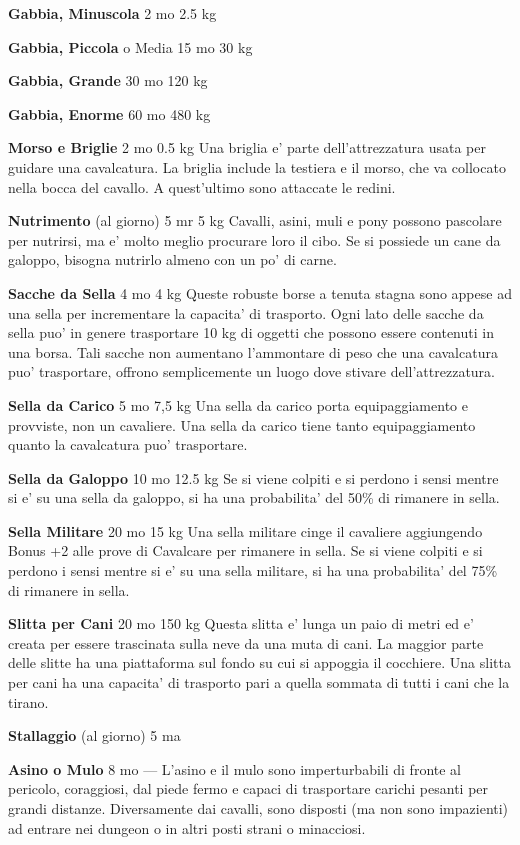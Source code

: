 \documentclass[a4paper,11pt,twoside,openany]{dndbook}
\begin{document}
{\textbf{Gabbia, Minuscola} 2 mo 2.5 kg

\textbf{Gabbia, Piccola} o Media 15 mo 30 kg

\textbf{Gabbia, Grande} 30 mo 120 kg

\textbf{Gabbia, Enorme} 60 mo 480 kg

\textbf{Morso e Briglie} 2 mo 0.5 kg Una briglia e' parte dell'attrezzatura usata per guidare una cavalcatura. La briglia include la testiera e il morso, che va collocato nella bocca del cavallo. A quest'ultimo sono attaccate le redini.

\textbf{Nutrimento} (al giorno) 5 mr 5 kg Cavalli, asini, muli e pony possono pascolare per nutrirsi, ma e' molto meglio procurare loro il cibo. Se si possiede un cane da galoppo, bisogna nutrirlo almeno con un po' di carne.

\textbf{Sacche da Sella} 4 mo 4 kg Queste robuste borse a tenuta stagna sono appese ad una sella per incrementare la capacita' di trasporto. Ogni lato delle sacche da sella puo' in genere trasportare 10 kg di oggetti che possono essere contenuti in una borsa. Tali sacche non aumentano l'ammontare di peso che una cavalcatura puo' trasportare, offrono semplicemente un luogo dove stivare dell'attrezzatura.

\textbf{Sella da Carico} 5 mo 7,5 kg Una sella da carico porta equipaggiamento e provviste, non un cavaliere. Una sella da carico tiene tanto equipaggiamento quanto la cavalcatura puo' trasportare.

\textbf{Sella da Galoppo} 10 mo 12.5 kg Se si viene colpiti e si perdono i sensi mentre si e' su una sella da galoppo, si ha una probabilita' del 50\% di rimanere in sella.

\textbf{Sella Militare} 20 mo 15 kg Una sella militare cinge il cavaliere aggiungendo Bonus +2 alle prove di Cavalcare per rimanere in sella. Se si viene colpiti e si perdono i sensi mentre si e' su una sella militare, si ha una probabilita' del 75\% di rimanere in sella.

\textbf{Slitta per Cani} 20 mo 150 kg Questa slitta e' lunga un paio di metri ed e' creata per essere trascinata sulla neve da una muta di cani. La maggior parte delle slitte ha una piattaforma sul fondo su cui si appoggia il cocchiere. Una slitta per cani ha una capacita' di trasporto pari a quella sommata di tutti i cani che la tirano.

\textbf{Stallaggio} (al giorno) 5 ma 

\textbf{Asino o Mulo} 8 mo --- L'asino e il mulo sono imperturbabili di fronte al pericolo, coraggiosi, dal piede fermo e capaci di trasportare carichi pesanti per grandi distanze. Diversamente dai cavalli, sono disposti (ma non sono impazienti) ad entrare nei dungeon o in altri posti strani o minacciosi.

}
\end{document}
